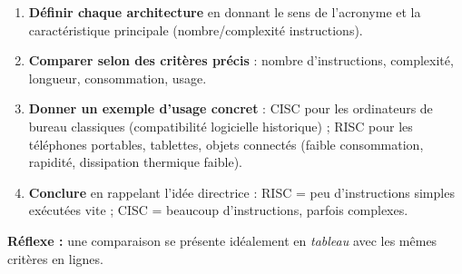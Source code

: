 \documentclass[11pt]{article}
\begin{document}
\begin{methode}
\begin{enumerate}
\item \textbf{Définir chaque architecture} en donnant le sens de l'acronyme et la caractéristique principale (nombre/complexité instructions).
\item \textbf{Comparer selon des critères précis} : nombre d'instructions, complexité, longueur, consommation, usage.
\item \textbf{Donner un exemple d'usage concret} : CISC pour les ordinateurs de bureau classiques (compatibilité logicielle historique) ; RISC pour les téléphones portables, tablettes, objets connectés (faible consommation, rapidité, dissipation thermique faible).
\item \textbf{Conclure} en rappelant l'idée directrice : RISC = peu d'instructions simples exécutées vite ; CISC = beaucoup d'instructions, parfois complexes.
\end{enumerate}
\textbf{Réflexe :} une comparaison se présente idéalement en \emph{tableau} avec les mêmes critères en lignes.
\end{methode}
\end{document}
